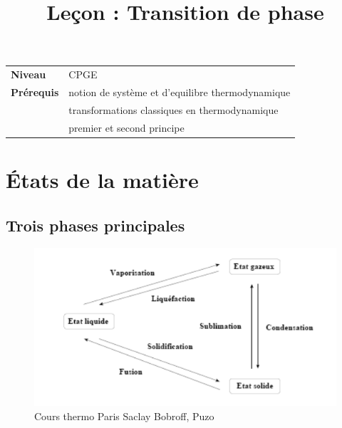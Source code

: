\documentclass[10pt]{beamer}
\title{Leçon : Transition de phase}
\begin{document}
\begin{frame}{}
    \titlepage

    \begin{tabularx}{\textwidth}{l@{:\,\,}X}
        \textbf{Niveau} 	  & CPGE\\
        \textbf{Prérequis} & notion de système et d'equilibre thermodynamique \\
        & transformations classiques en thermodynamique \\
        & premier et second principe
    \end{tabularx}
\end{frame}

\begin{frame}
    \tableofcontents
\end{frame}

\section{États de la matière}
\subsection{Trois phases principales}

\begin{frame}{\insertsubsection}
    \begin{figure}
        \centering
        \includegraphics[width= .8\textwidth]{EtatMatiere.png}
        \caption{Cours thermo Paris Saclay Bobroff, Puzo}
    \end{figure}
\end{frame}
\end{document}
